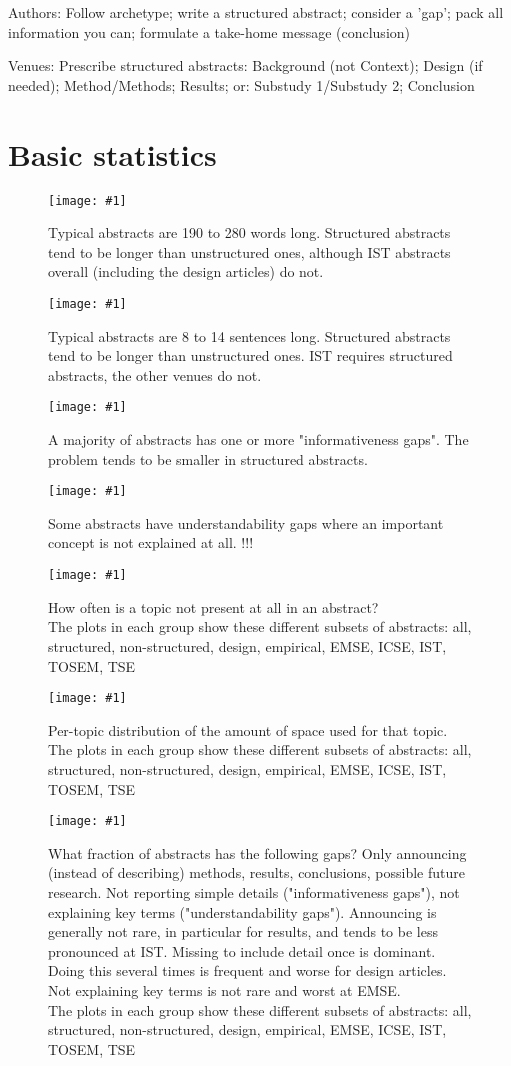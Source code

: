 \documentclass[10pt,journal,compsoc]{IEEEtran}
\newcommand{\Plot}[2]{%
	\begin{figure}[!t]%
		\centering\texttt{[image: \#1]}%
		\vspace{-4mm}\caption{#2}\label{#1}%
	\end{figure}}
\newcommand{\Plotwide}[2]{%
	\begin{figure*}%
		\centering\texttt{[image: \#1]}%
		\vspace{-4mm}\caption{#2}\label{#1}%
    \end{figure*}}
\begin{document}
\noindent
Authors: Follow archetype; write a structured abstract; consider a 'gap'; pack all information you can; formulate a take-home message (conclusion)

Venues: Prescribe structured abstracts: Background (not Context); Design (if needed); Method/Methods; Results; or: Substudy 1/Substudy 2; Conclusion



\appendix
\section{Basic statistics}

\Plot{boxplots_words}{%
  Typical abstracts are 190 to 280 words long. 
  Structured abstracts tend to be longer than unstructured ones, 
  although IST abstracts overall (including the design articles) do not.}
\Plot{boxplots_sentences}{%
	Typical abstracts are 8 to 14 sentences long.
	Structured abstracts tend to be longer than unstructured ones.
	IST requires structured abstracts, the other venues do not.}
\Plot{boxplots_icount}{%
  A majority of abstracts has one or more "informativeness gaps".
  The problem tends to be smaller in structured abstracts.}
\Plot{boxplots_ucount}{%
  Some abstracts have understandability gaps where an important concept is not explained at all.
  !!!}
\Plotwide{zerofractionbar_xletgroups_topicmissingfractions}{%
	How often is a topic not present at all in an abstract?\\
	The plots in each group show these different subsets of abstracts:
	all, structured, non-structured, design, empirical, EMSE, ICSE, IST, TOSEM, TSE}
\Plotwide{box_xletgroups_topicfractions}{%
	Per-topic distribution of the amount of space used for that topic.\\
	The plots in each group show these different subsets of abstracts:
	all, structured, non-structured, design, empirical, EMSE, ICSE, IST, TOSEM, TSE}
\Plotwide{nonzerofractionbar_xletgroups_missinginfofractions}{%
	What fraction of abstracts has the following gaps?
	Only announcing (instead of describing) methods, results, conclusions, possible future research.
	Not reporting simple details ("informativeness gaps"), not explaining key terms ("understandability gaps").
	Announcing is generally not rare, in particular for results, and tends to be less pronounced
	at IST. 
	Missing to include detail once is dominant.
	Doing this several times is frequent and worse for design articles.
	Not explaining key terms is not rare and worst at EMSE.\\
	The plots in each group show these different subsets of abstracts:
	all, structured, non-structured, design, empirical, EMSE, ICSE, IST, TOSEM, TSE}
\end{document}
